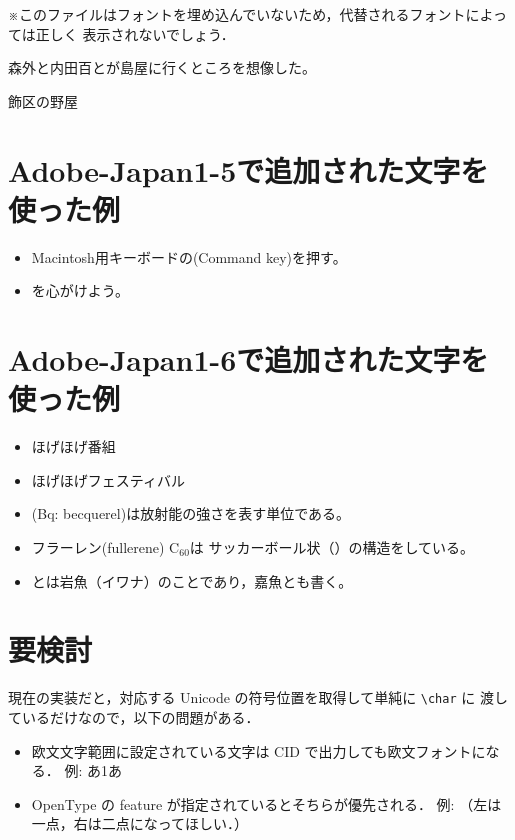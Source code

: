 \documentclass{bxjsarticle}
\begin{document}


※このファイルはフォントを埋め込んでいないため，代替されるフォントによっては正しく
表示されないでしょう．

森外と内田百とが島屋に行くところを想像した。

飾区の野屋

\section*{Adobe-Japan1-5で追加された文字を使った例}
\begin{itemize}
  \item Macintosh用キーボードの(Command key)を押す。
  \item {}を心がけよう。
\end{itemize}

\section*{Adobe-Japan1-6で追加された文字を使った例}
\begin{itemize}
  \item ほげほげ番組
  \item ほげほげフェスティバル
  \item {}(Bq: becquerel)は放射能の強さを表す単位である。
  \item フラーレン(fullerene) C$_{60}$は
        サッカーボール状（）の構造をしている。
  \item {}とは岩魚（イワナ）のことであり，嘉魚とも書く。
\end{itemize}

\section*{要検討}
現在の実装だと，対応する Unicode の符号位置を取得して単純に \verb|\char| に
渡しているだけなので，以下の問題がある．
\begin{itemize}
\item 欧文文字範囲に設定されている文字は CID で出力しても欧文フォントになる．
  例: あ1あ

\item OpenType の feature が指定されているとそちらが優先される．
  例: {}
  （左は一点，右は二点になってほしい．）
\end{itemize}
\end{document}
